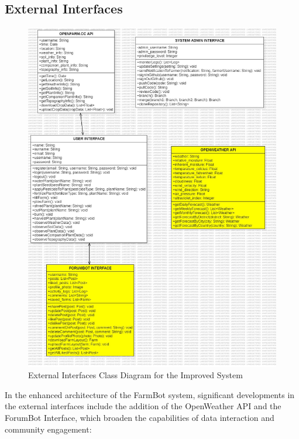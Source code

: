 \newpage
\subsection{External Interfaces}
\begin{figure}[htbp]
    \centering
    \includegraphics[width=0.7\linewidth]{Figures/improved_external_interfaces.jpg}
    \caption{External Interfaces Class Diagram for the Improved System}
    \label{ExternalImproved}
\end{figure}
\newpage
In the enhanced architecture of the FarmBot system, significant developments in the external interfaces include the addition of the OpenWeather API and the ForumBot Interface, which broaden the capabilities of data interaction and community engagement:
